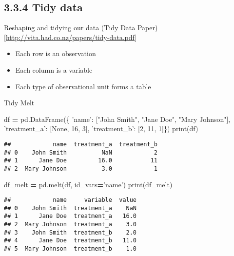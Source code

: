 \documentclass[]{book}
\newenvironment{Shaded}{\begin{snugshade}}{\end{snugshade}}
\newcommand{\BuiltInTok}[1]{#1}
\newcommand{\DecValTok}[1]{\textcolor[rgb]{0.00,0.00,0.81}{#1}}
\newcommand{\NormalTok}[1]{#1}
\newcommand{\OperatorTok}[1]{\textcolor[rgb]{0.81,0.36,0.00}{\textbf{#1}}}
\newcommand{\StringTok}[1]{\textcolor[rgb]{0.31,0.60,0.02}{#1}}
\newcommand{\VariableTok}[1]{\textcolor[rgb]{0.00,0.00,0.00}{#1}}
\providecommand{\tightlist}{%
  \setlength{\itemsep}{0pt}\setlength{\parskip}{0pt}}
\theoremstyle{definition}
\theoremstyle{definition}
\theoremstyle{definition}
\theoremstyle{remark}
\begin{document}
\hypertarget{tidy-data}{%
\subsection{3.3.4 Tidy data}\label{tidy-data}}

Reshaping and tidying our data (Tidy Data
Paper){[}\url{http://vita.had.co.nz/papers/tidy-data.pdf}{]}

\begin{itemize}
\tightlist
\item
  Each row is an observation
\item
  Each column is a variable
\item
  Each type of observational unit forms a table
\end{itemize}

Tidy Melt

\begin{Shaded}
\begin{Highlighting}[]
\NormalTok{df }\OperatorTok{=}\NormalTok{ pd.DataFrame(\{}
            \StringTok{'name'}\NormalTok{: [}\StringTok{"John Smith"}\NormalTok{, }\StringTok{"Jane Doe"}\NormalTok{, }\StringTok{"Mary Johnson"}\NormalTok{],}
            \StringTok{'treatment_a'}\NormalTok{: [}\VariableTok{None}\NormalTok{, }\DecValTok{16}\NormalTok{, }\DecValTok{3}\NormalTok{], }
            \StringTok{'treatment_b'}\NormalTok{: [}\DecValTok{2}\NormalTok{, }\DecValTok{11}\NormalTok{, }\DecValTok{1}\NormalTok{]\})}
\BuiltInTok{print}\NormalTok{(df)}
\end{Highlighting}
\end{Shaded}

\begin{verbatim}
##            name  treatment_a  treatment_b
## 0    John Smith          NaN            2
## 1      Jane Doe         16.0           11
## 2  Mary Johnson          3.0            1
\end{verbatim}

\begin{Shaded}
\begin{Highlighting}[]
\NormalTok{df_melt }\OperatorTok{=}\NormalTok{ pd.melt(df, id_vars}\OperatorTok{=}\StringTok{'name'}\NormalTok{)}
\BuiltInTok{print}\NormalTok{(df_melt)}
\end{Highlighting}
\end{Shaded}

\begin{verbatim}
##            name     variable  value
## 0    John Smith  treatment_a    NaN
## 1      Jane Doe  treatment_a   16.0
## 2  Mary Johnson  treatment_a    3.0
## 3    John Smith  treatment_b    2.0
## 4      Jane Doe  treatment_b   11.0
## 5  Mary Johnson  treatment_b    1.0
\end{verbatim}
\end{document}
